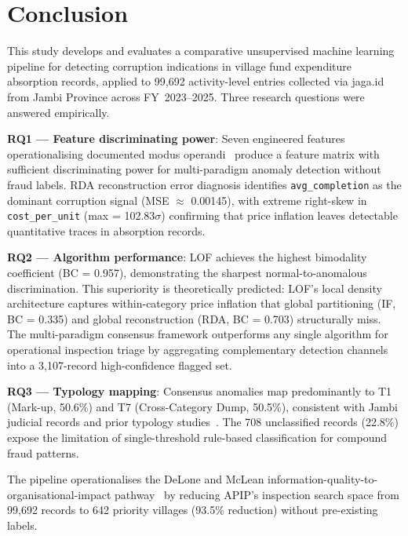 \documentclass[3p,times,procedia]{elsarticle}
\begin{document}
\section{Conclusion}
\label{sec:conclusion}

This study develops and evaluates a comparative unsupervised machine learning pipeline for detecting corruption indications in village fund expenditure absorption records, applied to 99,692 activity-level entries collected via jaga.id from Jambi Province across FY~2023--2025. Three research questions were answered empirically.

\textbf{RQ1 --- Feature discriminating power}: Seven engineered features operationalising documented modus operandi~\cite{ref13,ref14} produce a feature matrix with sufficient discriminating power for multi-paradigm anomaly detection without fraud labels. RDA reconstruction error diagnosis identifies \texttt{avg\_completion} as the dominant corruption signal (MSE $\approx$ 0.00145), with extreme right-skew in \texttt{cost\_per\_unit} (max = 102.83$\sigma$) confirming that price inflation leaves detectable quantitative traces in absorption records.

\textbf{RQ2 --- Algorithm performance}: LOF achieves the highest bimodality coefficient (BC = 0.957), demonstrating the sharpest normal-to-anomalous discrimination. This superiority is theoretically predicted: LOF's local density architecture captures within-category price inflation that global partitioning (IF, BC = 0.335) and global reconstruction (RDA, BC = 0.703) structurally miss. The multi-paradigm consensus framework outperforms any single algorithm for operational inspection triage by aggregating complementary detection channels into a 3,107-record high-confidence flagged set.

\textbf{RQ3 --- Typology mapping}: Consensus anomalies map predominantly to T1 (Mark-up, 50.6\%) and T7 (Cross-Category Dump, 50.5\%), consistent with Jambi judicial records and prior typology studies~\cite{ref13,ref14}. The 708 unclassified records (22.8\%) expose the limitation of single-threshold rule-based classification for compound fraud patterns.

The pipeline operationalises the DeLone and McLean information-quality-to-organisational-impact pathway~\cite{ref10} by reducing APIP's inspection search space from 99,692 records to 642 priority villages (93.5\% reduction) without pre-existing labels.
\end{document}
